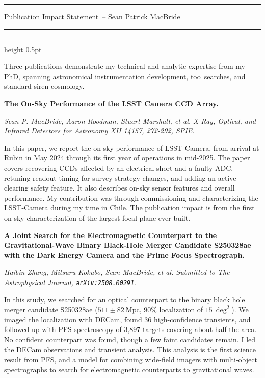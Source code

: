 \documentclass[12pt]{article}
\newcommand{\yourname}{Sean Patrick MacBride}
\newcommand{\soptitle}{Publication Impact Statement}
\newcommand{\ToO}{\ac{too}}
\begin{document}
\hrule
\begin{center}
    \Large\soptitle\ -- \yourname
\end{center}
\vspace{0pt}
\hrule
\vspace{0.5pt}
\hrule height 0.5pt
\vspace{3pt}

\normalsize
\noindent
\thispagestyle{plain}
Three publications demonstrate my technical and analytic expertise from my PhD, spanning astronomical instrumentation development, \ToO\ searches, and standard siren cosmology.

\textbf{The On-Sky Performance of the LSST Camera CCD Array.} 

\textit{Sean P. MacBride, Aaron Roodman, Stuart Marshall, et al. X-‌Ray, Optical, and Infrared Detectors for Astronomy XII 14157, 272-‌292, SPIE.}

In this paper, we report the on-sky performance of LSST-Camera, from arrival at Rubin in May 2024 through its first year of operations in mid-2025. The paper covers recovering CCDs affected by an electrical short and a faulty ADC, retuning readout timing for survey strategy changes, and adding an active clearing safety feature. It also describes on-sky sensor features and overall performance. My contribution was through commissioning and characterizing the LSST-Camera during my time in Chile. The publication impact is from the first on-sky characterization of the largest focal plane ever built.

\textbf{A Joint Search for the Electromagnetic Counterpart to the Gravitational-Wave Binary Black-Hole Merger Candidate S250328ae with the Dark Energy Camera and the Prime Focus Spectrograph.} 

\textit{Haibin Zhang, Mitsuru Kokubo, Sean MacBride, et al. Submitted to The Astrophysical Journal, \href{https://arxiv.org/abs/2508.00291}{\texttt{arXiv:2508.00291}}.} 

In this study, we searched for an optical counterpart to the binary black hole merger candidate S250328ae ($511 \pm 82\ \text{Mpc}$, $90\%$ localization of $15\ \deg^2$). We imaged the localization with DECam, found 36 high-confidence transients, and followed up with PFS spectroscopy of 3,897 targets covering about half the area. No confident counterpart was found, though a few faint candidates remain. I led the DECam observations and transient analysis. This analysis is the first science result from PFS, and a model for combining wide-field imagers with multi-object spectrographs to search for electromagnetic counterparts to gravitational waves.
\end{document}
